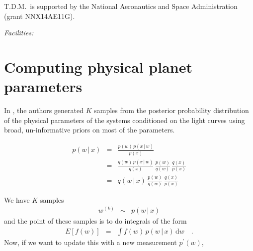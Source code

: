 \documentclass{emulateapj}
\newcommand{\dd}{{\ensuremath{\,\mathrm{d}}}}
\newcommand{\paperit}{\citet{Foreman-Mackey15}}
\newcommand{\todo}[3]{{\color{#2} \emph{#1} TO DO: #3}}
\newcommand{\btmtodo}[1]{\todo{BEN}{red}{#1}}
\begin{document}
T.D.M.~is supported by the National Aeronautics and Space Administration (grant
NNX14AE11G).

{\it Facilities:} %

\appendix
\section{Computing physical planet parameters}

In \paperit, the authors generated $K$ samples from the posterior probability
distribution of the physical parameters of the systems conditioned on the
light curves using broad, un-informative priors on most of the parameters.

\begin{eqnarray}
p(w\,|\,x) &=& \frac{p(w)\,p(x\,|\,w)}{p(x)} \\
&=& \frac{q(w)\,p(x\,|\,w)}{q(x)}\,\frac{p(w)}{q(w)}\,\frac{q(x)}{p(x)} \\
&=& q(w\,|\,x)\,\frac{p(w)}{q(w)}\,\frac{q(x)}{p(x)}
\end{eqnarray}

We have $K$ samples
\begin{eqnarray}
w^{(k)} &\sim& p(w\,|\,x)
\end{eqnarray}
and the point of these samples is to do integrals of the form
\begin{eqnarray}
E[f(w)] &=& \int f(w)\,p(w\,|\,x) \dd w \quad.
\end{eqnarray}
Now, if we want to update this with a new measurement $p^\prime(w)$,





\turnpage




\end{document}
